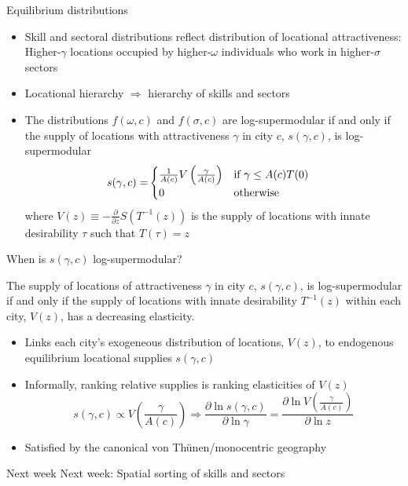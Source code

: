\documentclass[11pt,notes=hide,aspectratio=169]{beamer}
\begin{document}
\begin{frame}{Equilibrium distributions}
\begin{itemize}
\item Skill and sectoral distributions reflect distribution of locational
attractiveness: Higher-$\gamma$ locations occupied by higher-$\omega$
individuals who work in higher-$\sigma$ sectors
\item Locational hierarchy $\Rightarrow$ hierarchy of skills and sectors
\item The distributions $f(\omega,c)$ and $f(\sigma,c)$ are log-supermodular
if and only if the supply of locations with attractiveness $\gamma$
in city $c$, $s(\gamma,c)$, is log-supermodular 
\begin{align*}
s(\gamma,c)= & \begin{cases}
\frac{1}{A(c)}V\left(\frac{\gamma}{A(c)}\right) & \textnormal{if }\gamma\leq A(c)T(0)\\
0 & \textnormal{otherwise}
\end{cases}
\end{align*}
where\textrm{ $V(z)\equiv-\frac{\partial}{\partial z}S\left(T^{-1}(z)\right)$
is }the supply of locations with innate desirability $\tau$ such
that $T(\tau)=z$
\end{itemize}
\end{frame}
\begin{frame}{When is $s(\gamma,c)$ log-supermodular?}
\begin{proposition}
\label{prop:LocationDistribution}The supply of locations of attractiveness
$\gamma$ in city $c$, $s(\gamma,c)$, is log-supermodular if and
only if the supply of locations with innate desirability \textrm{\textup{$T^{-1}(z)$}}
within each city, $V(z)$, has a decreasing elasticity.\end{proposition}
\begin{itemize}
\item Links each city's exogeneous distribution of locations, $V(z)$, to
endogenous equilibrium locational supplies $s(\gamma,c)$
\item Informally, ranking relative supplies is ranking elasticities of $V(z)$
\[
s(\gamma,c)\propto V\left(\frac{\gamma}{A(c)}\right)\Rightarrow\frac{\partial\ln s(\gamma,c)}{\partial\ln\gamma}=\frac{\partial\ln V\left(\frac{\gamma}{A(c)}\right)}{\partial\ln z}
\]
\item Satisfied by the canonical von Th\"{u}nen/monocentric geography
\end{itemize}
\end{frame}
\begin{frame}{Next week}
Next week: Spatial sorting of skills and sectors
\end{frame}
\end{document}
